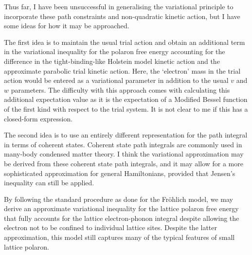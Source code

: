 Thus far, I have been unsuccessful in generalising the variational principle to incorporate these path constraints and non-quadratic kinetic action, but I have some ideas for how it may be approached.

The first idea is to maintain the usual trial action and obtain an additional term in the variational inequality for the polaron free energy accounting for the difference in the tight-binding-like Holstein model kinetic action and the approximate parabolic trial kinetic action. Here, the `electron' mass in the trial action would be entered as a variational parameter in addition to the usual $v$ and $w$ parameters. The difficulty with this approach comes with calculating this additional expectation value as it is the expectation of a Modified Bessel function of the first kind with respect to the trial system. It is not clear to me if this has a closed-form expression.

The second idea is to use an entirely different representation for the path integral in terms of coherent states. Coherent state path integrals are commonly used in many-body condensed matter theory. I think the variational approximation may be derived from these coherent state path integrals, and it may allow for a more sophisticated approximation for general Hamiltonians, provided that Jensen's inequality can still be applied. 

By following the standard procedure as done for the Fr\"ohlich model, we may derive an approximate variational inequality for the lattice polaron free energy that fully accounts for the lattice electron-phonon integral despite allowing the electron not to be confined to individual lattice sites. Despite the latter approximation, this model still captures many of the typical features of small lattice polaron.

